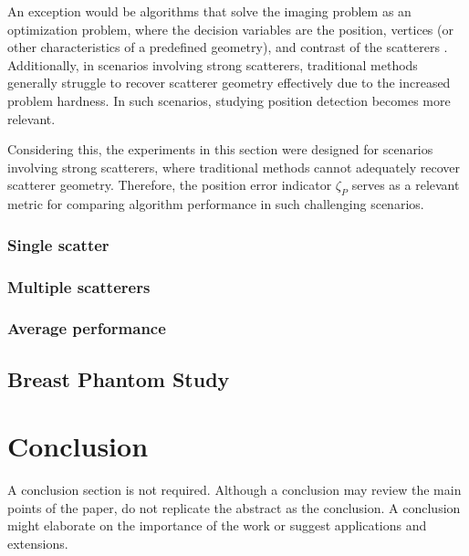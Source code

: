 \documentclass{IEEEtran}
\begin{document}
            An exception would be algorithms that solve the imaging problem as an optimization problem, where the decision variables are the position, vertices (or other characteristics of a predefined geometry), and contrast of the scatterers \cite{michalski2000electromagnetic,salucci2022learned,zardi2025physics}. Additionally, in scenarios involving strong scatterers, traditional methods generally struggle to recover scatterer geometry effectively due to the increased problem hardness. In such scenarios, studying position detection becomes more relevant.


            Considering this, the experiments in this section were designed for scenarios involving strong scatterers, where traditional methods cannot adequately recover scatterer geometry. Therefore, the position error indicator $\zeta_P$ serves as a relevant metric for comparing algorithm performance in such challenging scenarios.

			\subsubsection{Single scatter}\label{sec:results:position:single}
			
			\subsubsection{Multiple scatterers}\label{sec:results:position:multiple}
			
			\subsubsection{Average performance}\label{sec:results:position:benchmark}

        \subsection{Breast Phantom Study}\label{sec:results:breast}

    \section{Conclusion}\label{sec:conclusion}
        A conclusion section is not required. Although a conclusion may review the main points of the paper, do not replicate the abstract as the conclusion. A  conclusion might elaborate on the importance of the work or suggest applications and extensions. \cite{chen2018computational}
    
\end{document}
